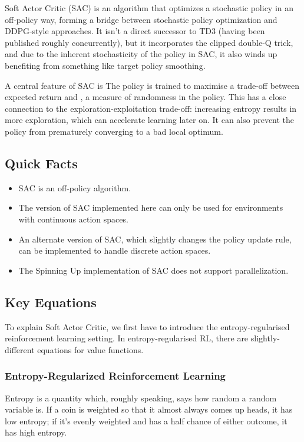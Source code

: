 \documentclass[letterpaper,10pt,english]{sphinxmanual}
\begin{document}
Soft Actor Critic (SAC) is an algorithm that optimizes a stochastic policy in an off-policy way, forming a bridge between stochastic policy optimization and DDPG-style approaches. It isn’t a direct successor to TD3 (having been published roughly concurrently), but it incorporates the clipped double-Q trick, and due to the inherent stochasticity of the policy in SAC, it also winds up benefiting from something like target policy smoothing.

A central feature of SAC is  The policy is trained to maximise a trade-off between expected return and , a measure of randomness in the policy. This has a close connection to the exploration-exploitation trade-off: increasing entropy results in more exploration, which can accelerate learning later on. It can also prevent the policy from prematurely converging to a bad local optimum.


\subsection{Quick Facts}
\label{\detokenize{algorithms/lac:quick-facts}}\begin{itemize}
\item {} 
SAC is an off-policy algorithm.

\item {} 
The version of SAC implemented here can only be used for environments with continuous action spaces.

\item {} 
An alternate version of SAC, which slightly changes the policy update rule, can be implemented to handle discrete action spaces.

\item {} 
The Spinning Up implementation of SAC does not support parallelization.

\end{itemize}


\subsection{Key Equations}
\label{\detokenize{algorithms/lac:key-equations}}
To explain Soft Actor Critic, we first have to introduce the entropy-regularised reinforcement learning setting. In entropy-regularised RL, there are slightly-different equations for value functions.


\subsubsection{Entropy-Regularized Reinforcement Learning}
\label{\detokenize{algorithms/lac:entropy-regularized-reinforcement-learning}}
Entropy is a quantity which, roughly speaking, says how random a random variable is. If a coin is weighted so that it almost always comes up heads, it has low entropy; if it’s evenly weighted and has a half chance of either outcome, it has high entropy.
\end{document}
